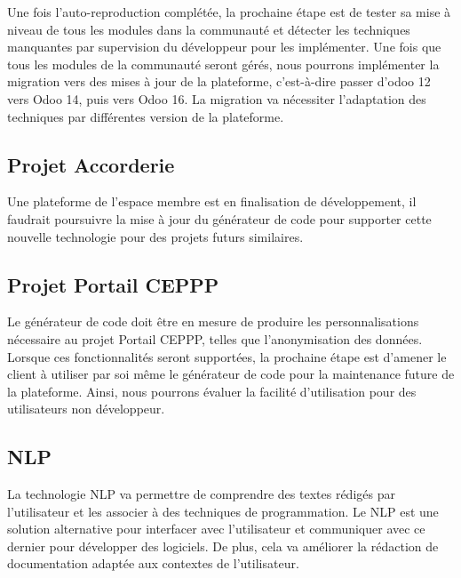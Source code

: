 Une fois l'auto-reproduction complétée, la prochaine étape est de tester sa mise à niveau de tous les modules dans la communauté et détecter les techniques manquantes par supervision du développeur pour les implémenter. Une fois que tous les modules de la communauté seront gérés, nous pourrons implémenter la migration vers des mises à jour de la plateforme, c’est-à-dire passer d'odoo 12 vers Odoo 14, puis vers Odoo 16. La migration va nécessiter l'adaptation des techniques par différentes version de la plateforme.


\subsection{Projet Accorderie}

Une plateforme de l'espace membre est en finalisation de développement, il faudrait poursuivre la mise à jour du générateur de code pour supporter cette nouvelle technologie pour des projets futurs similaires.


\subsection{Projet Portail CEPPP}

Le générateur de code doit être en mesure de produire les personnalisations nécessaire au projet Portail CEPPP, telles que l'anonymisation des données. Lorsque ces fonctionnalités seront supportées, la prochaine étape est d'amener le client à utiliser par soi même le générateur de code pour la maintenance future de la plateforme. Ainsi, nous pourrons évaluer la facilité d'utilisation pour des utilisateurs non développeur.

\subsection{NLP}
La technologie NLP va permettre de comprendre des textes rédigés par l’utilisateur et les associer à des techniques de programmation. Le NLP est une solution alternative pour interfacer avec l’utilisateur et communiquer avec ce dernier pour développer des logiciels. De plus, cela va améliorer la rédaction de documentation adaptée aux contextes de l'utilisateur. 

